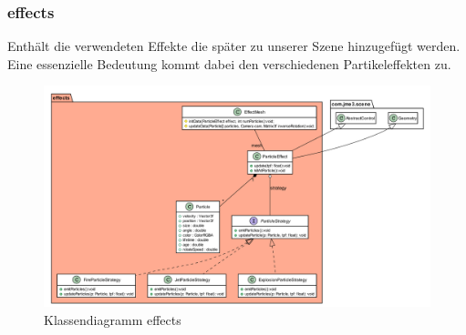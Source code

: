         \subsubsection{effects}
        Enthält die verwendeten Effekte die später zu unserer Szene hinzugefügt
        werden. Eine essenzielle Bedeutung kommt dabei den verschiedenen Partikeleffekten
        zu. \par
        \begin{figure}[htbp]
            \centering
            \includegraphics[width=1\linewidth]{InGameGrafik/Bilder/particleeffect.png}
            \caption{Klassendiagramm effects}
        \end{figure}
